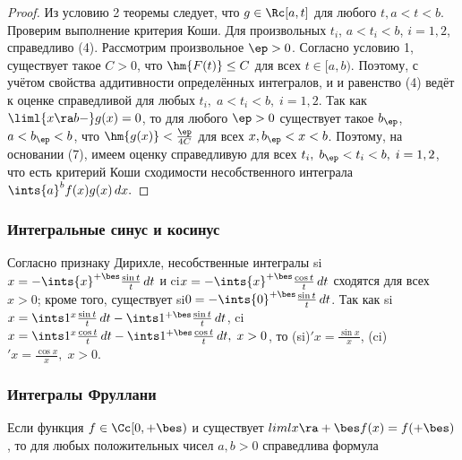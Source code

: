 \documentclass[a4paper]{article}
\begin{document}
\begin{proof}
Из условию 2 теоремы следует, что $g\in\Rc[a,t]$ для любого $t,
a<t<b$. Проверим выполнение критерия Коши. Для произвольных $t_i$,
$a<t_i<b$, $i=1,2$, справедливо (4). Рассмотрим произвольное
$\ep>0$. Согласно условию 1, существует такое $C>0$, что
$\hm{F(t)}\le C$ для всех $t\in[a,b)$. Поэтому, с учётом свойства
аддитивности определённых интегралов,  и  и равенство (4) ведёт к оценке
 справедливой для
любых $t_i, \; a<t_i<b, \; i=1,2$. Так как $\liml{x\ra b-} g(x)=0$,
то для любого $\ep>0$ существует такое $b_{\ep}$, $a<b_{\ep}<b$, что
$\hm{g(x)} < \frac{\ep}{4C}$ для всех $x,b_{\ep}<x<b$. Поэтому, на
основании (7), имеем оценку  справедливую для
всех $t_i, \; b_{\ep}<t_i<b, \; i=1,2$, что есть критерий Коши
сходимости несобственного интеграла $\ints{a}^b f(x)g(x)\,dx.$
\end{proof}

\subsubsection{Интегральные синус и косинус}

Согласно признаку Дирихле, несобственные интегралы si$x =
-\ints{x}^{+\bes} \frac{\sin t}{t}\,dt$ и ci$x = -\ints{x}^{+\bes}
\frac{\cos t}{t}\,dt$ сходятся для всех $x>0$; кроме того,
существует si$0 = -\ints{0}^{+\bes} \frac{\sin t}{t}\,dt$. Так как
si$x = \ints1^x \frac{\sin t}t \,dt - \ints1^{+\bes} \frac{\sin
t}{t}\,dt$, ci$x = \ints1^x \frac{\cos t}{t}\,dt - \ints1^{+\bes}
\frac{\cos t}t\,dt, \; x>0$, то (si)$'x=\frac{\sin x}x$,
(ci)$'x=\frac{\cos x}x, \; x>0$.

\subsubsection{Интегралы Фруллани}
\begin{theorem}
Если функция $f\in\Cc[0,+\bes)$ и существует $\\liml{x\ra+\bes} f(x)
= f(+\bes)$, то для любых положительных чисел $a,b>0$ справедлива
формула 
\end{theorem}
\end{document}
